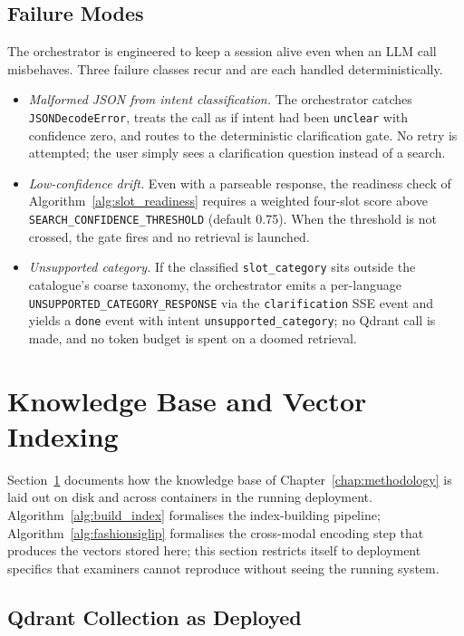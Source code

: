 \subsection{Failure Modes}

The orchestrator is engineered to keep a session alive even when an LLM call misbehaves. Three failure classes recur and are each handled deterministically.

\begin{itemize}[leftmargin=1.5em,itemsep=2pt,topsep=2pt]
    \item \emph{Malformed JSON from intent classification.} The orchestrator catches \texttt{JSONDecodeError}, treats the call as if intent had been \texttt{unclear} with confidence zero, and routes to the deterministic clarification gate. No retry is attempted; the user simply sees a clarification question instead of a search.
    \item \emph{Low-confidence drift.} Even with a parseable response, the readiness check of Algorithm~\ref{alg:slot_readiness} requires a weighted four-slot score above \texttt{SEARCH\_CONFIDENCE\_THRESHOLD} (default 0.75). When the threshold is not crossed, the gate fires and no retrieval is launched.
    \item \emph{Unsupported category.} If the classified \texttt{slot\_category} sits outside the catalogue's coarse taxonomy, the orchestrator emits a per-language \texttt{UNSUPPORTED\_CATEGORY\_RESPONSE} via the \texttt{clarification} SSE event and yields a \texttt{done} event with intent \texttt{unsupported\_category}; no Qdrant call is made, and no token budget is spent on a doomed retrieval.
\end{itemize}


\section{Knowledge Base and Vector Indexing}
\label{sec:impl_kb}

Section~\ref{sec:impl_kb} documents how the knowledge base of Chapter~\ref{chap:methodology} is laid out on disk and across containers in the running deployment. Algorithm~\ref{alg:build_index} formalises the index-building pipeline; Algorithm~\ref{alg:fashionsiglip} formalises the cross-modal encoding step that produces the vectors stored here; this section restricts itself to deployment specifics that examiners cannot reproduce without seeing the running system.

\subsection{Qdrant Collection as Deployed}

